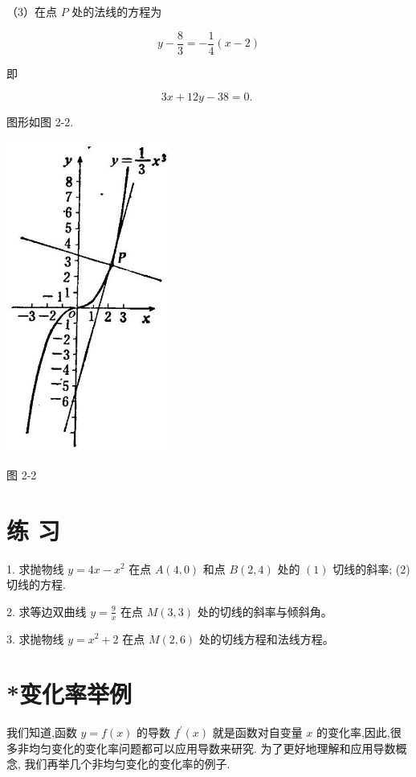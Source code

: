 \documentclass[10pt]{article}
\begin{document}
（3）在点 \(P\) 处的法线的方程为

\[
y - \frac{8}{3} = - \frac{1}{4}\left( {x - 2}\right)
\]

即

\[
{3x} + {12y} - {38} = 0\text{. }
\]

图形如图 2-2.

\begin{center}
\includegraphics[max width=0.4\textwidth]{images/01912c18-5c3f-733d-b775-749ba9897a9d_65_242214.jpg}
\end{center}

图 2-2

\section*{练 习}

1. 求抛物线 \(y = {4x} - {x}^{2}\) 在点 \(A\left( {4,0}\right)\) 和点 \(B\left( {2,4}\right)\) 处的 \(\left( 1\right)\) 切线的斜率; (2) 切线的方程.

2. 求等边双曲线 \(y = \frac{9}{x}\) 在点 \(M\left( {3,3}\right)\) 处的切线的斜率与倾斜角。

3. 求抛物线 \(y = {x}^{2} + 2\) 在点 \(M\left( {2,6}\right)\) 处的切线方程和法线方程。

\section*{*变化率举例}

我们知道,函数 \(y = f\left( x\right)\) 的导数 \({f}^{\prime }\left( x\right)\) 就是函数对自变量 \(x\) 的变化率,因此,很多非均匀变化的变化率问题都可以应用导数来研究. 为了更好地理解和应用导数概念, 我们再举几个非均匀变化的变化率的例子.
\end{document}
